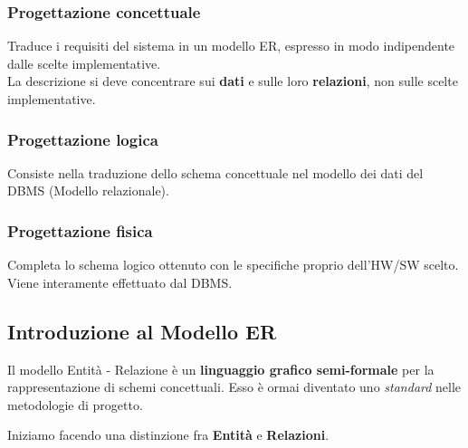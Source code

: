 \documentclass[12pt, a4paper]{article}
\begin{document}
    \subsubsection{Progettazione concettuale}
    Traduce i requisiti del sistema in un modello ER, espresso in modo indipendente dalle scelte implementative.
    \\La descrizione si deve concentrare sui \textbf{dati} e sulle loro \textbf{relazioni}, non sulle scelte implementative.

    \subsubsection{Progettazione logica}
    Consiste nella traduzione dello schema concettuale nel modello dei dati del DBMS (Modello relazionale).

    \subsubsection{Progettazione fisica}
    Completa lo schema logico ottenuto con le specifiche proprio dell'HW/SW scelto. 
    Viene interamente effettuato dal DBMS. 
    \newpage
    \subsection{Introduzione al Modello ER}
    Il modello Entità - Relazione è un \textbf{linguaggio grafico semi-formale} per la rappresentazione di schemi concettuali.
    Esso è ormai diventato uno \textit{standard} nelle metodologie di progetto.

    Iniziamo facendo una distinzione fra \textbf{Entità} e \textbf{Relazioni}.
\end{document}
